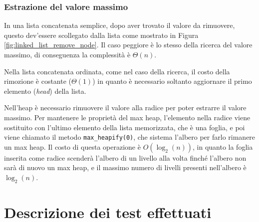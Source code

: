 \documentclass{article}
\begin{document}
\subsubsection{Estrazione del valore massimo}

In una lista concatenata semplice, dopo aver trovato il valore da rimuovere, questo dev'essere scollegato dalla lista come mostrato in Figura \ref{fig:linked_list_remove_node}. Il caso peggiore è lo stesso della ricerca del valore massimo, di conseguenza la complessità è $\Theta(n)$.

\vspace{5pt}
Nella lista concatenata ordinata, come nel caso della ricerca, il costo della rimozione è costante ($\Theta(1)$) in quanto è necessario soltanto aggiornare il primo elemento (\emph{head}) della lista.

\vspace{5pt}
Nell'heap è necessario rimuovere il valore alla radice per poter estrarre il valore massimo. Per mantenere le proprietà del max heap, l'elemento nella radice viene sostituito con l'ultimo elemento della lista memorizzata, che è una foglia, e poi viene chiamato il metodo \verb|max_heapify(0)|, che sistema l'albero per farlo rimanere un max heap. Il costo di questa operazione è $O(\log_2(n))$, in quanto la foglia inserita come radice scenderà l'albero di un livello alla volta finché l'albero non sarà di nuovo un max heap, e il massimo numero di livelli presenti nell'albero è $\log_2(n)$.

\begin{table}[h]
\centering
{}
\caption{Prestazioni attese}
\label{tab:performance}
\end{table}

\section{Descrizione dei test effettuati}
\end{document}
